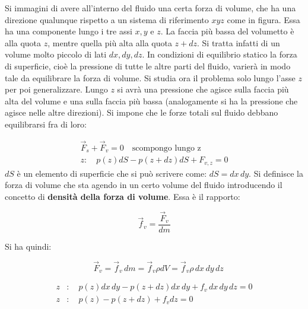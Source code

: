 \begin{figure}[htpb]
\end{figure}
\FloatBarrier
Si immagini di avere all'interno del fluido una certa forza di volume, che ha una direzione qualunque rispetto a un sistema di riferimento $xyz$ come in figura. Essa ha una componente lungo i tre assi $x, y$ e $z$. La faccia più bassa del volumetto è alla quota $z$, mentre quella più alta alla quota $z+dz$. Si tratta infatti di un volume molto piccolo di lati $dx, dy, dz$. In condizioni di equilibrio statico la forza di superficie, cioè la pressione di tutte le altre parti del fluido, varierà in modo tale da equilibrare la forza di volume.  Si studia ora il problema solo lungo l'asse $z$ per poi generalizzare. Lungo $z$ si avrà una pressione che agisce sulla faccia più alta del volume e una sulla faccia più bassa (analogamente si ha la pressione che agisce nelle altre direzioni). Si impone che le forze totali sul fluido debbano equilibrarsi fra di loro:

\begin{gather*}
	\vec{F}_s + \vec{F}_v = 0 \quad \text{scompongo lungo z}\\
	z:\quad p(z)dS - p(z+dz)dS + F_{v,z} = 0
\end{gather*}
$dS$ è un elemento di superficie che si può scrivere come: $dS=dx\,dy$.
Si definisce la forza di volume che sta agendo in un certo volume del fluido introducendo il concetto di \textbf{densità della forza di volume}. Essa è il rapporto:

\[
	\vec{f}_v = \frac{\vec{F}_v }{dm} \]

Si ha quindi:

\[
	\quad \vec{F}_v = \vec{f}_v\,dm = \vec{f}_v\rho dV = \vec{f}_v\rho\,dx\,dy\,dz
\]

\begin{equation*}
	\begin{aligned}
		z&:\quad p(z)dx\,dy - p(z+dz)dx\,dy + f_v\,dx\,dy\,dz = 0 \\
		z&:\quad p(z) - p(z+dz) + f_v dz = 0
	\end{aligned}
\end{equation*}

